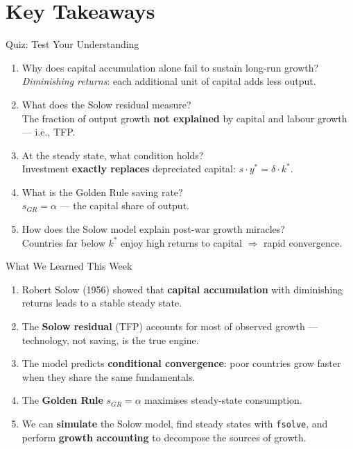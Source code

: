 \documentclass[aspectratio=169, 10pt]{beamer}
\begin{document}
\section{Key Takeaways}

\begin{frame}{Quiz: Test Your Understanding}
\begin{enumerate}
  \item Why does capital accumulation alone fail to sustain long-run growth?\\
        \textit{Diminishing returns}: each additional unit of capital
        adds less output.
  \item What does the Solow residual measure?\\
        The fraction of output growth \textbf{not explained} by
        capital and labour growth --- i.e., TFP.
  \item At the steady state, what condition holds?\\
        Investment \textbf{exactly replaces} depreciated capital:
        $s \cdot y^* = \delta \cdot k^*$.
  \item What is the Golden Rule saving rate?\\
        $s_{GR} = \alpha$ --- the capital share of output.
  \item How does the Solow model explain post-war growth miracles?\\
        Countries far below $k^*$ enjoy high returns to capital
        $\Rightarrow$ \alert{rapid convergence}.
\end{enumerate}
\end{frame}

\begin{frame}{What We Learned This Week}
\begin{enumerate}
  \item Robert Solow (1956) showed that \textbf{capital accumulation}
        with diminishing returns leads to a stable \alert{steady state}.
  \item The \textbf{Solow residual} (TFP) accounts for most of observed
        growth --- technology, not saving, is the true engine.
  \item The model predicts \textbf{conditional convergence}: poor countries
        grow faster when they share the same fundamentals.
  \item The \textbf{Golden Rule} $s_{GR} = \alpha$ maximises steady-state
        consumption.
  \item We can \textbf{simulate} the Solow model, find steady states with
        \texttt{fsolve}, and perform \textbf{growth accounting}
        to decompose the sources of growth.
\end{enumerate}
\end{frame}
\end{document}
